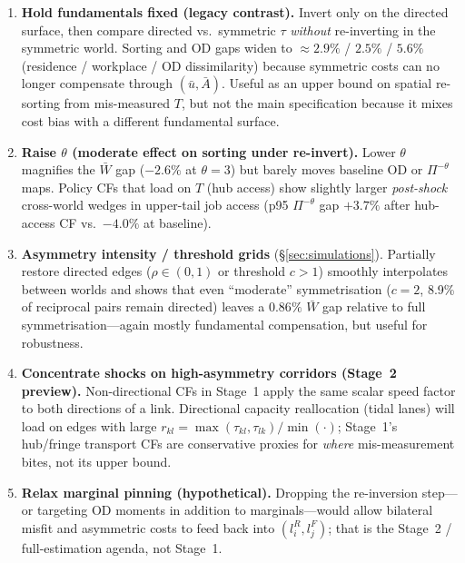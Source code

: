 \documentclass[12pt]{article}
\newcommand{\Wbar}{\bar W}
\begin{document}
\begin{enumerate}[leftmargin=2em,itemsep=0.35em]
  \item \textbf{Hold fundamentals fixed (legacy contrast).}
        Invert only on the directed surface, then compare directed vs.\ symmetric
        $\tau$ \emph{without} re-inverting in the symmetric world.
        Sorting and OD gaps widen to $\approx 2.9\%$ / $2.5\%$ / $5.6\%$ (residence /
        workplace / OD dissimilarity) because symmetric costs can no longer compensate
        through $(\bar u,\bar A)$.
        Useful as an upper bound on spatial re-sorting from mis-measured $T$, but not the
        main specification because it mixes cost bias with a different fundamental surface.

  \item \textbf{Raise $\theta$ (moderate effect on sorting under re-invert).}
        Lower $\theta$ magnifies the $\Wbar$ gap ($-2.6\%$ at $\theta=3$) but barely
        moves baseline OD or $\Pi^{- \theta}$ maps.
        Policy CFs that load on $T$ (hub access) show slightly larger \emph{post-shock}
        cross-world wedges in upper-tail job access (p95 $\Pi^{- \theta}$ gap $+3.7\%$
        after hub-access CF vs.\ $-4.0\%$ at baseline).

  \item \textbf{Asymmetry intensity / threshold grids} (\S\ref{sec:simulations}).
        Partially restore directed edges ($\rho\in(0,1)$ or threshold $c>1$) smoothly
        interpolates between worlds and shows that even ``moderate'' symmetrisation
        ($c=2$, 8.9\% of reciprocal pairs remain directed) leaves a $0.86\%$ $\Wbar$
        gap relative to full symmetrisation---again mostly fundamental compensation,
        but useful for robustness.

  \item \textbf{Concentrate shocks on high-asymmetry corridors (Stage~2 preview).}
        Non-directional CFs in Stage~1 apply the same scalar speed factor to both
        directions of a link.
        Directional capacity reallocation (tidal lanes) will load on edges with large
        $r_{kl}=\max(\tau_{kl},\tau_{lk})/\min(\cdot)$; Stage~1's hub/fringe transport
        CFs are conservative proxies for \emph{where} mis-measurement bites, not its
        upper bound.

  \item \textbf{Relax marginal pinning (hypothetical).}
        Dropping the re-inversion step---or targeting OD moments in addition to
        marginals---would allow bilateral misfit and asymmetric costs to feed back into
        $(l_i^R,l_j^F)$; that is the Stage~2 / full-estimation agenda, not Stage~1.
\end{enumerate}
\end{document}
